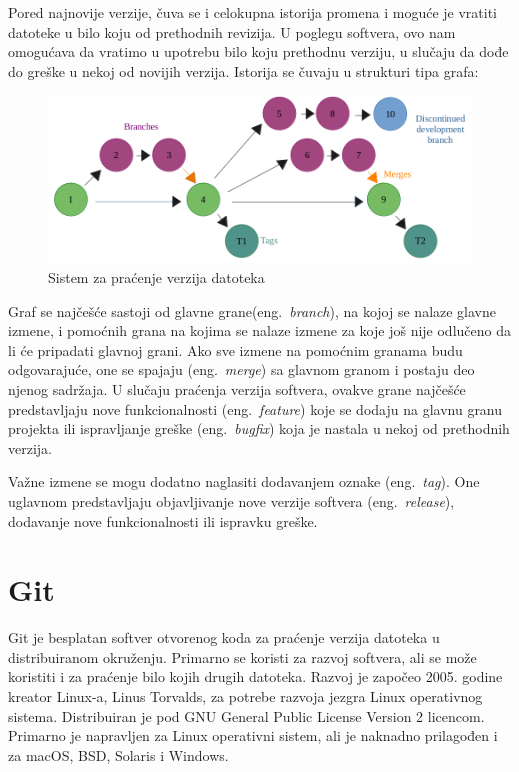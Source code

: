 \documentclass[12pt]{report}
\begin{document}
Pored najnovije verzije, čuva se i celokupna istorija promena i moguće je vratiti datoteke u bilo koju od prethodnih revizija. U poglegu softvera, ovo nam omogućava da vratimo u upotrebu bilo koju prethodnu verziju, u slučaju da dođe do greške u nekoj od novijih verzija. Istorija se čuvaju u strukturi tipa grafa:

\begin{figure}[H]
    \includegraphics[width=\linewidth]{images/version_control.png}
    \caption{Sistem za praćenje verzija datoteka}
\end{figure}

Graf se najčešće sastoji od glavne grane(eng.\ \textit{branch}), na kojoj se nalaze glavne izmene, i pomoćnih grana na kojima se nalaze izmene za koje još nije odlučeno da li će pripadati glavnoj grani. Ako sve izmene na pomoćnim granama budu odgovarajuće, one se spajaju (eng.\ \textit{merge}) sa glavnom granom i postaju deo njenog sadržaja. U slučaju praćenja verzija softvera, ovakve grane najčešće predstavljaju nove funkcionalnosti (eng.\ \textit{feature}) koje se dodaju na glavnu granu projekta ili ispravljanje greške (eng.\ \textit{bugfix}) koja je nastala u nekoj od prethodnih verzija.

Važne izmene se mogu dodatno naglasiti dodavanjem oznake (eng.\ \textit{tag}). One uglavnom predstavljaju objavljivanje nove verzije softvera (eng.\ \textit{release}), dodavanje nove funkcionalnosti ili ispravku greške.

\section{Git}
Git \cite{git} je besplatan softver otvorenog koda za praćenje verzija datoteka u distribuiranom okruženju. Primarno se koristi za razvoj softvera, ali se može koristiti i za praćenje bilo kojih drugih datoteka. Razvoj je započeo 2005. godine kreator Linux-a, Linus Torvalds, za potrebe razvoja jezgra Linux operativnog sistema. Distribuiran je pod GNU General Public License Version 2 licencom. Primarno je napravljen za Linux operativni sistem, ali je naknadno prilagođen i za macOS, BSD, Solaris i Windows.
\end{document}
